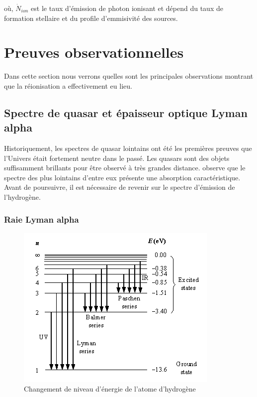 où, $\dot{N}_{ion}$  est le taux d'émission de photon ionisant et dépend du taux de formation stellaire et du profile d'emmisivité des sources.


\section{Preuves observationnelles}
\label{sec_contraintes_obs}

Dans cette section nous verrons quelles sont les principales observations montrant que la réionisation a effectivement eu lieu.

\subsection{Spectre de quasar et épaisseur optique Lyman alpha}

Historiquement, les spectres de quasar lointains ont été les premières preuves que l'Univers était fortement neutre dans le passé.
Les quasars sont des objets suffisamment brillants pour être observé à très grandes distance.
\cite{1965ApJ...141.1295S} observe que le spectre des plus lointains d'entre eux présente une absorption caractéristique.%
Avant de poursuivre, il est nécessaire  de revenir sur le spectre d’émission de l’hydrogène.

\subsubsection*{Raie Lyman alpha}

\begin{figure}
\centering
        \includegraphics[width=.9\textwidth]{img/01/lyman.jpg} 
        \caption[Raies de l'hydrogène]{Changement de niveau d'énergie de l'atome d'hydrogène}
 		\label{fig:lyman}
\end{figure}

